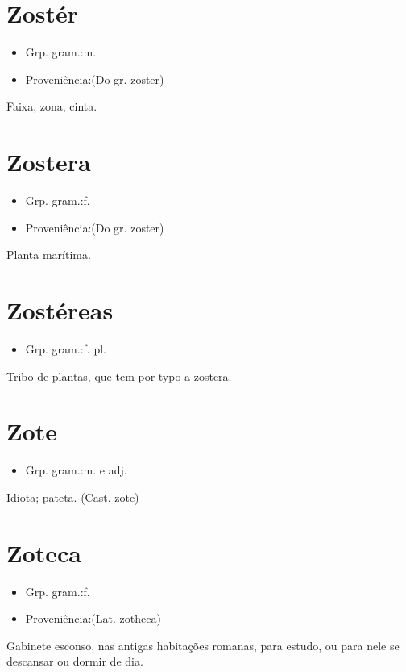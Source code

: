 \section{Zostér}
\begin{itemize}
\item {Grp. gram.:m.}
\end{itemize}
\begin{itemize}
\item {Proveniência:(Do gr. \textunderscore zoster\textunderscore )}
\end{itemize}
Faixa, zona, cinta.
\section{Zostera}
\begin{itemize}
\item {Grp. gram.:f.}
\end{itemize}
\begin{itemize}
\item {Proveniência:(Do gr. \textunderscore zoster\textunderscore )}
\end{itemize}
Planta marítima.
\section{Zostéreas}
\begin{itemize}
\item {Grp. gram.:f. pl.}
\end{itemize}
Tribo de plantas, que tem por typo a zostera.
\section{Zote}
\begin{itemize}
\item {Grp. gram.:m.  e  adj.}
\end{itemize}
Idiota; pateta.
(Cast. \textunderscore zote\textunderscore )
\section{Zoteca}
\begin{itemize}
\item {Grp. gram.:f.}
\end{itemize}
\begin{itemize}
\item {Proveniência:(Lat. \textunderscore zotheca\textunderscore )}
\end{itemize}
Gabinete esconso, nas antigas habitações romanas, para estudo, ou para nele se descansar ou dormir de dia.

